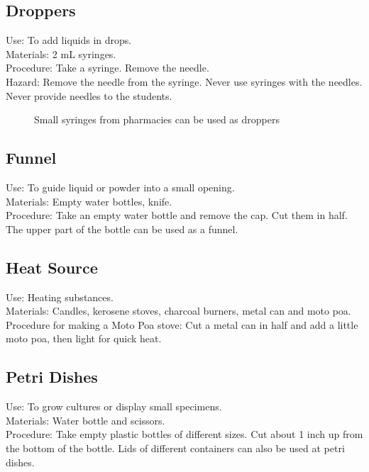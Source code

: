 \subsection*{Droppers}


Use: To add liquids in drops.\\
Materials: 2 mL syringes.\\
Procedure: Take a syringe. Remove the needle. \\
Hazard: Remove the needle from the syringe. Never use syringes with the needles. Never provide needles to the students.\\

\begin{figure}[H]
\begin{center}
\def\svgwidth{3cm}

\caption{Small syringes from pharmacies can be used as droppers}
\label{fig:droppers}
\end{center}
\end{figure}


\subsection*{Funnel}


Use: To guide liquid or powder into a small opening.\\
Materials: Empty water bottles, knife.\\
Procedure: Take an empty water bottle and remove the cap. Cut them in half. The upper part of the bottle can be used as a funnel.\\


\subsection*{Heat Source}


Use: Heating substances.\\
Materials: Candles, kerosene stoves, charcoal burners, metal can and moto poa.\\
Procedure for making a Moto Poa stove: Cut a metal can in half and add a little moto poa, then light for quick heat.\\


\subsection*{Petri Dishes}


Use: To grow cultures or display small specimens.\\
Materials: Water bottle and scissors.\\
Procedure: Take empty plastic bottles of different sizes. Cut about 1 inch up from the bottom of the bottle. Lids of different containers can also be used at petri dishes.\\


